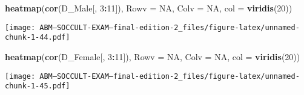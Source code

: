 \documentclass[]{article}
\newenvironment{Shaded}{\begin{snugshade}}{\end{snugshade}}
\newcommand{\KeywordTok}[1]{\textcolor[rgb]{0.13,0.29,0.53}{\textbf{#1}}}
\newcommand{\DataTypeTok}[1]{\textcolor[rgb]{0.13,0.29,0.53}{#1}}
\newcommand{\DecValTok}[1]{\textcolor[rgb]{0.00,0.00,0.81}{#1}}
\newcommand{\StringTok}[1]{\textcolor[rgb]{0.31,0.60,0.02}{#1}}
\newcommand{\CommentTok}[1]{\textcolor[rgb]{0.56,0.35,0.01}{\textit{#1}}}
\newcommand{\OtherTok}[1]{\textcolor[rgb]{0.56,0.35,0.01}{#1}}
\newcommand{\OperatorTok}[1]{\textcolor[rgb]{0.81,0.36,0.00}{\textbf{#1}}}
\newcommand{\AlertTok}[1]{\textcolor[rgb]{0.94,0.16,0.16}{#1}}
\newcommand{\NormalTok}[1]{#1}
\begin{document}
\begin{Shaded}
\begin{Highlighting}[]
\KeywordTok{heatmap}\NormalTok{(}\KeywordTok{cor}\NormalTok{(D_Male[, }\DecValTok{3}\OperatorTok{:}\DecValTok{11}\NormalTok{]), }\DataTypeTok{Rowv =} \OtherTok{NA}\NormalTok{, }\DataTypeTok{Colv =} \OtherTok{NA}\NormalTok{, }\DataTypeTok{col =} \KeywordTok{viridis}\NormalTok{(}\DecValTok{20}\NormalTok{))}
\end{Highlighting}
\end{Shaded}

\texttt{[image: ABM---SOCCULT-EXAM---final-edition-2\_files/figure-latex/unnamed-chunk-1-44.pdf]}

\begin{Shaded}
\begin{Highlighting}[]
\KeywordTok{heatmap}\NormalTok{(}\KeywordTok{cor}\NormalTok{(D_Female[, }\DecValTok{3}\OperatorTok{:}\DecValTok{11}\NormalTok{]), }\DataTypeTok{Rowv =} \OtherTok{NA}\NormalTok{, }\DataTypeTok{Colv =} \OtherTok{NA}\NormalTok{, }\DataTypeTok{col =} \KeywordTok{viridis}\NormalTok{(}\DecValTok{20}\NormalTok{))}
\end{Highlighting}
\end{Shaded}

\texttt{[image: ABM---SOCCULT-EXAM---final-edition-2\_files/figure-latex/unnamed-chunk-1-45.pdf]}

\begin{Shaded}
\end{Shaded}
\end{document}
